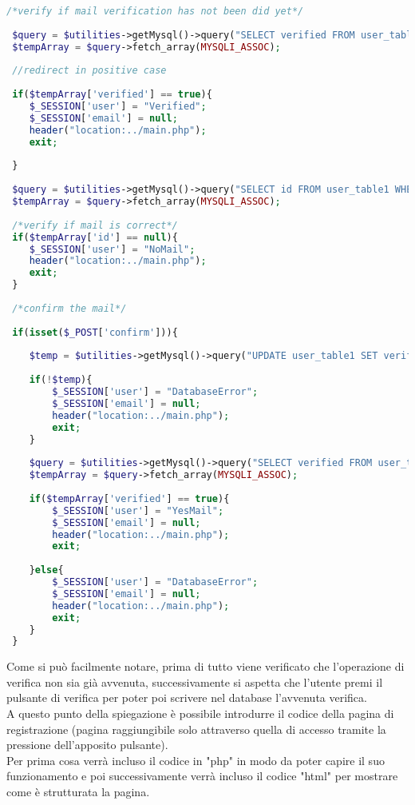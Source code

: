  \begin{lstlisting}[language=php]
 /*verify if mail verification has not been did yet*/
 
 $query = $utilities->getMysql()->query("SELECT verified FROM user_table1 WHERE (email = '{$_SESSION['email']}')");
 $tempArray = $query->fetch_array(MYSQLI_ASSOC);
 
 //redirect in positive case
 
 if($tempArray['verified'] == true){
 	$_SESSION['user'] = "Verified";
 	$_SESSION['email'] = null;
 	header("location:../main.php");
 	exit;
 	
 }
 
 $query = $utilities->getMysql()->query("SELECT id FROM user_table1 WHERE (email = '{$_SESSION['email']}')");
 $tempArray = $query->fetch_array(MYSQLI_ASSOC);
 
 /*verify if mail is correct*/
 if($tempArray['id'] == null){
 	$_SESSION['user'] = "NoMail";
 	header("location:../main.php");
 	exit;
 }
 
 /*confirm the mail*/
 
 if(isset($_POST['confirm'])){
 	
 	$temp = $utilities->getMysql()->query("UPDATE user_table1 SET verified = 1 WHERE (id = '{$tempArray['id']}')");
 	
 	if(!$temp){
 		$_SESSION['user'] = "DatabaseError";
 		$_SESSION['email'] = null;
 		header("location:../main.php");
 		exit;
 	}
 	
 	$query = $utilities->getMysql()->query("SELECT verified FROM user_table1 WHERE (email = '{$_SESSION['email']}')");
 	$tempArray = $query->fetch_array(MYSQLI_ASSOC);
 	
 	if($tempArray['verified'] == true){
 		$_SESSION['user'] = "YesMail";
 		$_SESSION['email'] = null;
 		header("location:../main.php");
 		exit;
 		
 	}else{
 		$_SESSION['user'] = "DatabaseError";
 		$_SESSION['email'] = null;
 		header("location:../main.php");
 		exit;
 	}
 }
 \end{lstlisting}
 
 Come si può facilmente notare, prima di tutto viene verificato che l'operazione di verifica non sia già avvenuta, successivamente si aspetta che l'utente premi il pulsante di verifica per poter poi scrivere nel database l'avvenuta verifica.\\
 
 A questo punto della spiegazione è possibile introdurre il codice della pagina di registrazione (pagina raggiungibile solo attraverso quella di accesso tramite la pressione dell'apposito pulsante).\\
 Per prima cosa verrà incluso il codice in "php" in modo da poter capire il suo funzionamento e poi successivamente verrà incluso il codice "html" per mostrare come è strutturata la pagina.\\
 
